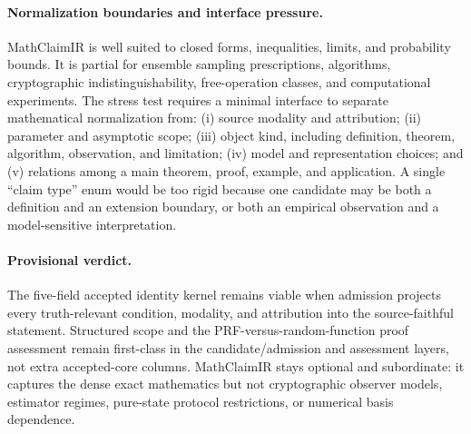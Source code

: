 \paragraph{Normalization boundaries and interface pressure.}
MathClaimIR is well suited to closed forms, inequalities, limits, and probability bounds. It is partial for ensemble sampling prescriptions, algorithms, cryptographic indistinguishability, free-operation classes, and computational experiments. The stress test requires a minimal interface to separate mathematical normalization from: (i) source modality and attribution; (ii) parameter and asymptotic scope; (iii) object kind, including definition, theorem, algorithm, observation, and limitation; (iv) model and representation choices; and (v) relations among a main theorem, proof, example, and application. A single ``claim type'' enum would be too rigid because one candidate may be both a definition and an extension boundary, or both an empirical observation and a model-sensitive interpretation.

\paragraph{Provisional verdict.}
The five-field accepted identity kernel remains viable when admission projects every truth-relevant condition, modality, and attribution into the source-faithful statement. Structured scope and the PRF-versus-random-function proof assessment remain first-class in the candidate/admission and assessment layers, not extra accepted-core columns. MathClaimIR stays optional and subordinate: it captures the dense exact mathematics but not cryptographic observer models, estimator regimes, pure-state protocol restrictions, or numerical basis dependence.
